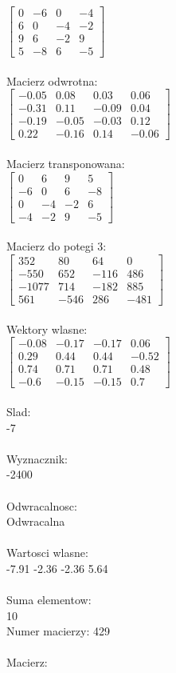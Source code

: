 \documentclass[a4paper,12pt]{article}
\begin{document}
$\begin{bmatrix} 0&-6&0&-4\\6&0&-4&-2\\9&6&-2&9\\5&-8&6&-5 \end{bmatrix}$
\\
\\
Macierz odwrotna:\\

$\begin{bmatrix} -0.05&0.08&0.03&0.06\\-0.31&0.11&-0.09&0.04\\-0.19&-0.05&-0.03&0.12\\0.22&-0.16&0.14&-0.06 \end{bmatrix}$
\\
\\
Macierz transponowana:\\

$\begin{bmatrix} 0&6&9&5\\-6&0&6&-8\\0&-4&-2&6\\-4&-2&9&-5 \end{bmatrix}$
\\
\\
Macierz do potegi 3:\\

$\begin{bmatrix} 352&80&64&0\\-550&652&-116&486\\-1077&714&-182&885\\561&-546&286&-481 \end{bmatrix}$
\\
\\
Wektory wlasne:\\

$\begin{bmatrix} -0.08&-0.17&-0.17&0.06\\0.29&0.44&0.44&-0.52\\0.74&0.71&0.71&0.48\\-0.6&-0.15&-0.15&0.7 \end{bmatrix}$
\\
\\
Slad:\\
-7
\\
\\
Wyznacznik:\\
-2400
\\
\\
Odwracalnosc:\\
Odwracalna
\\
\\
Wartosci wlasne:\\
-7.91 -2.36 -2.36 5.64
\\
\\
Suma elementow:\\
10
\\
\newpage
Numer macierzy:
429
\\
\\
Macierz:\\
\end{document}

